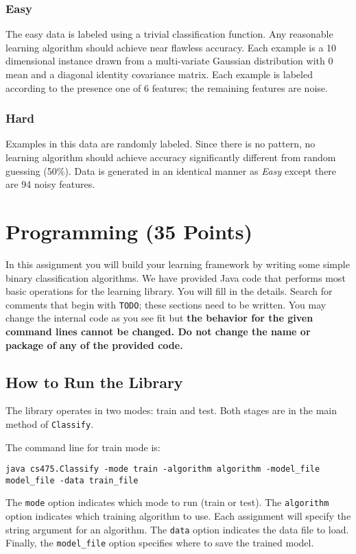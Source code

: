 \documentclass[11pt]{article}
\begin{document}
\subsubsection{Easy}
The easy data is labeled using a trivial classification function. Any reasonable learning algorithm should achieve near flawless accuracy. Each example is a 10 dimensional instance drawn from a multi-variate Gaussian distribution with 0 mean and a diagonal identity covariance matrix. Each example is labeled according to the presence one of 6 features; the remaining features are noise.

\subsubsection{Hard}
Examples in this data are randomly labeled. Since there is no pattern, no learning algorithm should achieve accuracy significantly different from random guessing (50\%). Data is generated in an identical manner as \emph{Easy} except there are 94 noisy features.






\section{Programming (35 Points)}
In this assignment you will build your learning framework by writing some simple binary classification algorithms. We have provided Java code that performs most basic operations for the learning library. You will fill in the details. Search for comments that begin with {\tt TODO}; these sections need to be written. You may change the internal code as you see fit but \textbf{the behavior for the given command lines cannot be changed. Do not change the name or package of any of the provided code.}

\subsection{How to Run the Library}
The library operates in two modes: train and test. Both stages are in the main method of {\tt Classify}.

The command line for train mode is:
\begin{footnotesize}
\begin{verbatim}
java cs475.Classify -mode train -algorithm algorithm -model_file model_file -data train_file
\end{verbatim}
\end{footnotesize}
The {\tt mode} option indicates which mode to run (train or test). The {\tt algorithm} option indicates which training algorithm to use. Each assignment will specify the string argument for an algorithm. The {\tt data} option indicates the data file to load. Finally, the {\tt model\_file} option specifies where to save the trained model.
\end{document}
